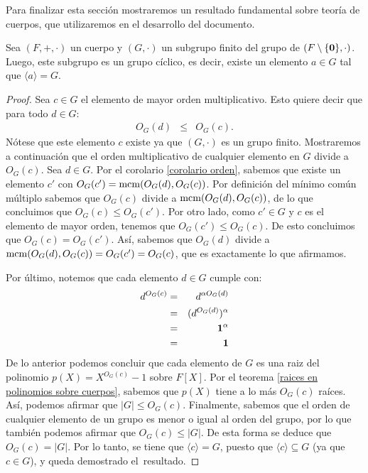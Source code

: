 Para finalizar esta sección mostraremos un resultado fundamental sobre
teoría de cuerpos, que utilizaremos en el desarrollo del documento.
\begin{theorem}\label{subgrupo de cuerpo  es ciclico}
Sea $(F,+,\cdot)$ un cuerpo y $(G,\cdot)$ un subgrupo finito del grupo
de $(F\setminus\{\mathbf{0}\},\cdot)$.
Luego, este subgrupo es un grupo cíclico, es decir, existe un elemento
$a\in G$ tal que $\langle a\rangle = G$.
\end{theorem}
\begin{proof}
Sea $c\in G$ el elemento de mayor orden multiplicativo. Esto quiere
decir que para todo $d\in G$:
\begin{eqnarray*}
O_G(d) & \leq & O_G(c).
\end{eqnarray*}
Nótese que este elemento $c$ existe ya que $(G,\cdot)$ es un grupo
finito.  Mostraremos a continuación que el orden multiplicativo de
cualquier elemento en $G$ divide a $O_G(c)$. Sea $d\in G$. Por el
corolario \ref{corolario orden}, sabemos que existe un elemento $c'$
con $O_G(c') = {\rm mcm}(O_G(d),O_G(c))$. Por definición del mínimo común
múltiplo sabemos que $O_G(c)$ divide a ${\rm mcm}(O_G(d),O_G(c))$, de lo
que concluimos que $O_G(c)\leq O_G(c')$. Por otro lado, como $c'\in G$
y $c$ es el elemento de mayor orden, tenemos que $O_G(c')\leq
O_G(c)$. De esto concluimos que $O_G(c)=O_G(c')$. Así, sabemos que
$O_G(d)$ divide a ${\rm mcm}(O_G(d),O_G(c)) = O_G(c') = O_G(c)$, que es
exactamente lo que afirmamos.
	
	Por último, notemos que cada elemento $d\in G$ cumple con:
	\begin{eqnarray*}
		d^{O_G(c)} &=& d^{\alpha O_G(d)}\\
		&=& (d^{O_G(d)})^{\alpha}\\
		&=& \mathbf{1}^{\alpha}\\
		&=& \mathbf{1}
	\end{eqnarray*}
%
De lo anterior podemos concluir que cada elemento de $G$ es una raiz
del polinomio $p(X)=X^{O_G(c)} - 1$ sobre $F[X]$. Por el
teorema \ref{raices en polinomios sobre cuerpos}, sabemos que $p(X)$
tiene a lo más $O_G(c)$ raíces. Así, podemos afirmar que $|G|\leq
O_G(c)$. Finalmente, sabemos que el orden de cualquier elemento de un
grupo es menor o igual al orden del grupo, por lo que también podemos
afirmar que $O_G(c)\leq |G|$. De esta forma se deduce que
$O_G(c)= |G|$. Por lo tanto, se tiene que $\langle c\rangle = G$, puesto
que $\langle c\rangle \subseteq G$ (ya que $c \in G$), y queda
demostrado el~resultado.
\end{proof}


